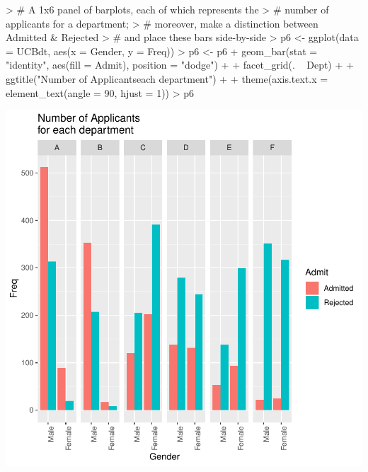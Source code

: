 \documentclass[12pt,letterpaper,final]{article}
\begin{document}
\begin{Schunk}
\begin{Sinput}
> # A 1x6 panel of barplots, each of which represents the 
> # number of applicants for a department;
> # moreover, make a distinction between Admitted & Rejected 
> # and place these bars side-by-side
> p6 <- ggplot(data = UCBdt, aes(x = Gender, y = Freq))
> p6 <- p6 + geom_bar(stat = "identity", aes(fill = Admit), position = "dodge") + 
+   facet_grid(. ~ Dept) + 
+   ggtitle("Number of Applicants\nfor each department") + 
+   theme(axis.text.x = element_text(angle = 90, hjust = 1))
> p6
\end{Sinput}
\end{Schunk}
\includegraphics{lect_main-022}
\end{document}
